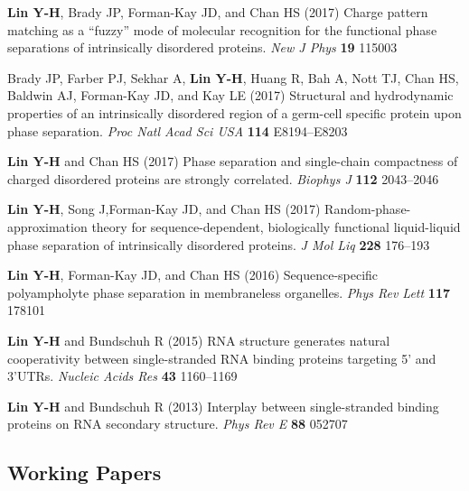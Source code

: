 \documentclass[11pt]{../yhlcv}
\def\tname#1{{\bf #1}}
\begin{document}
\begin{etaremune}[leftmargin=0.26in]
\item
\tname{Lin Y-H}, Brady JP, Forman-Kay JD, and Chan HS (2017) 
Charge pattern matching as a ``fuzzy'' mode of molecular recognition for the functional phase separations of intrinsically disordered proteins.
{\it New J Phys} {\bf 19} 115003

\item 
Brady JP, Farber PJ, Sekhar A, \tname{Lin Y-H}, Huang R, Bah A, Nott TJ, Chan HS, Baldwin AJ, Forman-Kay JD, and Kay LE (2017) 
Structural and hydrodynamic properties of an intrinsically disordered region of a germ-cell specific protein upon phase separation. 
{\it Proc Natl Acad Sci USA} {\bf 114} E8194--E8203

\item
\tname{Lin Y-H} and Chan HS (2017) 
Phase separation and single-chain compactness of charged disordered proteins are strongly correlated. 
{\it Biophys J} {\bf 112} 2043--2046

\item 
\tname{Lin Y-H}, Song J,Forman-Kay JD, and Chan HS  (2017) 
Random-phase-approximation theory for sequence-dependent, biologically functional liquid-liquid phase separation of intrinsically disordered proteins. 
{\it J Mol Liq} {\bf 228} 176--193

\item
\tname{Lin Y-H}, Forman-Kay JD, and Chan HS (2016) 
Sequence-specific polyampholyte phase separation in membraneless organelles. 
{\it Phys Rev Lett} {\bf 117} 178101

\item 
\tname{Lin Y-H} and Bundschuh R (2015) 
RNA structure generates natural cooperativity between single-stranded RNA binding proteins targeting 5' and 3'UTRs.
{\it Nucleic Acids Res} {\bf 43} 1160--1169

\item 
\tname{Lin Y-H} and Bundschuh R (2013) 
Interplay between single-stranded binding proteins on RNA secondary structure.
{\it Phys Rev E} {\bf 88} 052707

\end{etaremune} 

\subsection*{Working Papers}
\end{document}
